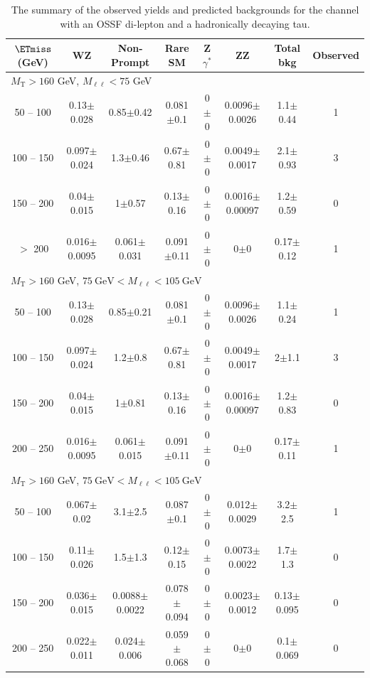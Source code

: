 \begin{table}
\scriptsize
\begin{center}
\caption{\label{tab:OSSF1tau1} The summary of the observed yields and predicted backgrounds for the channel 
with an OSSF di-lepton and a hadronically decaying tau. }
\begin{tabular}{| c | c c c c c c c | }\hline\hline
$\ETmiss$ (GeV) & WZ & Non-Prompt & Rare SM & Z$\gamma^*$ & ZZ & Total bkg & Observed\\\hline\hline
\multicolumn{8}{l}{$M_{\text{T}} > 160$ GeV, $M_{\ell\ell} < 75$ GeV}\\\hline\hline
50 -- 100&0.13$\pm$0.028&0.85$\pm$0.42&0.081$\pm$0.1&0$\pm$0&0.0096$\pm$0.0026&1.1$\pm$0.44&1\\
100 -- 150&0.097$\pm$0.024&1.3$\pm$0.46&0.67$\pm$0.81&0$\pm$0&0.0049$\pm$0.0017&2.1$\pm$0.93&3\\
150 -- 200&0.04$\pm$0.015&1$\pm$0.57&0.13$\pm$0.16&0$\pm$0&0.0016$\pm$0.00097&1.2$\pm$0.59&0\\
$>$ 200&0.016$\pm$0.0095&0.061$\pm$0.031&0.091$\pm$0.11&0$\pm$0&0$\pm$0&0.17$\pm$0.12&1\\
\hline\hline
\multicolumn{8}{l}{$M_{\text{T}} > 160$ GeV, $75~\mathrm{GeV} < M_{\ell\ell} < 105~\mathrm{GeV}$}\\\hline\hline
50 -- 100&0.13$\pm$0.028&0.85$\pm$0.21&0.081$\pm$0.1&0$\pm$0&0.0096$\pm$0.0026&1.1$\pm$0.24&1\\
100 -- 150&0.097$\pm$0.024&1.2$\pm$0.8&0.67$\pm$0.81&0$\pm$0&0.0049$\pm$0.0017&2$\pm$1.1&3\\
150 -- 200&0.04$\pm$0.015&1$\pm$0.81&0.13$\pm$0.16&0$\pm$0&0.0016$\pm$0.00097&1.2$\pm$0.83&0\\
200 -- 250&0.016$\pm$0.0095&0.061$\pm$0.015&0.091$\pm$0.11&0$\pm$0&0$\pm$0&0.17$\pm$0.11&1\\
\hline\hline
\multicolumn{8}{l}{$M_{\text{T}} > 160$ GeV, $75~\mathrm{GeV} < M_{\ell\ell} < 105~\mathrm{GeV}$}\\\hline\hline
50 -- 100&0.067$\pm$0.02&3.1$\pm$2.5&0.087$\pm$0.1&0$\pm$0&0.012$\pm$0.0029&3.2$\pm$2.5&1\\
100 -- 150&0.11$\pm$0.026&1.5$\pm$1.3&0.12$\pm$0.15&0$\pm$0&0.0073$\pm$0.0022&1.7$\pm$1.3&0\\
150 -- 200&0.036$\pm$0.015&0.0088$\pm$0.0022&0.078$\pm$0.094&0$\pm$0&0.0023$\pm$0.0012&0.13$\pm$0.095&0\\
200 -- 250&0.022$\pm$0.011&0.024$\pm$0.006&0.059$\pm$0.068&0$\pm$0&0$\pm$0&0.1$\pm$0.069&0\\
\hline\hline

\end{tabular}
\end{center}
\end{table}
